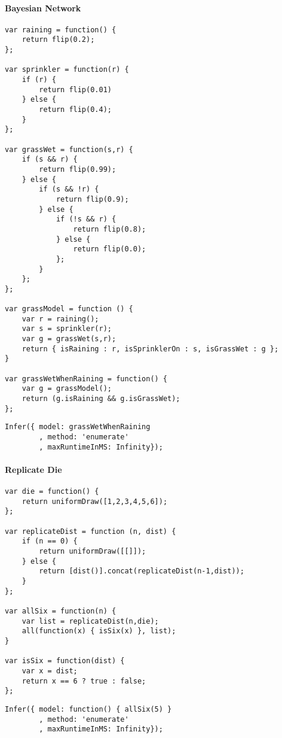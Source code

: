 \paragraph{Bayesian Network}
\begin{verbatim}
var raining = function() {
    return flip(0.2);
};

var sprinkler = function(r) {
    if (r) {
        return flip(0.01)
    } else {
        return flip(0.4);
    }
};

var grassWet = function(s,r) {
    if (s && r) {
        return flip(0.99);
    } else {
        if (s && !r) {
            return flip(0.9);
        } else {
            if (!s && r) {
                return flip(0.8);
            } else {
                return flip(0.0);
            };
        }
    };
};

var grassModel = function () {
    var r = raining();
    var s = sprinkler(r);
    var g = grassWet(s,r);
    return { isRaining : r, isSprinklerOn : s, isGrassWet : g };
}

var grassWetWhenRaining = function() {
    var g = grassModel();
    return (g.isRaining && g.isGrassWet);
};

\end{verbatim}

\begin{verbatim}
Infer({ model: grassWetWhenRaining
        , method: 'enumerate'
        , maxRuntimeInMS: Infinity});
\end{verbatim}

\paragraph{Replicate Die}

\begin{verbatim}
var die = function() {
    return uniformDraw([1,2,3,4,5,6]);
};

var replicateDist = function (n, dist) {
    if (n == 0) {
        return uniformDraw([[]]);
    } else {
        return [dist()].concat(replicateDist(n-1,dist));
    }
};

var allSix = function(n) {
    var list = replicateDist(n,die);
    all(function(x) { isSix(x) }, list);
}

var isSix = function(dist) {
    var x = dist;
    return x == 6 ? true : false;
};

\end{verbatim}

\begin{verbatim}
Infer({ model: function() { allSix(5) }
        , method: 'enumerate'
        , maxRuntimeInMS: Infinity});
\end{verbatim}

